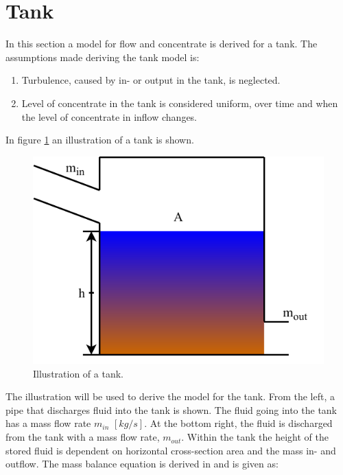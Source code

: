 \section{Tank}\label{se:sewer_reservoir}
In this section a model for flow and concentrate is derived for a tank.%
 The assumptions made deriving the tank model is:
\begin{table}[H]
\begin{enumerate}
\item Turbulence, caused by in- or output in the tank, is neglected.
\item Level of concentrate in the tank is considered uniform, over time and when the level of concentrate in inflow changes. 
\end{enumerate}
\end{table}

In figure \ref{fig:tank_model} an illustration of a tank is shown.
\begin{figure}[H]
\centering
\includegraphics[width=.55\textwidth]{report/modeling/pictures/reservior.pdf}
\caption{Illustration of a tank.}
\label{fig:tank_model}
\end{figure} 

The illustration will be used to derive the model for the tank. From the left, a pipe that discharges fluid into the tank is shown. The fluid going into the tank has a mass flow rate $m_{in}$ $\left[kg/s\right]$. At the bottom right, the fluid is discharged from the tank with a mass flow rate, $m_{out}$. 
Within the tank the height of the stored fluid is dependent on horizontal cross-section area and the mass in- and outflow.
The mass balance equation is derived in \cite{model_tank} and is given as:


